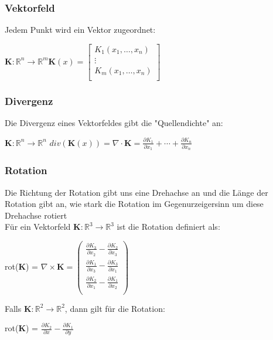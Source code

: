\documentclass[a4paper, fontsize = 8pt, landscape]{scrartcl}
\newcommand{\R}[0]{\mathbb{R}}
\begin{document}
\begin{multicols*}{3}
    \subsubsection*{Vektorfeld}
    Jedem Punkt wird ein Vektor zugeordnet:
    \begin{center}
        $\mathbf{K}: \R^n \rightarrow \R^m \mathbf{K}(x) =  \begin{bmatrix}
                K_1(x_1, \dots, x_n) \\
                \vdots               \\
                K_m(x_1, \dots, x_n) \\
            \end{bmatrix}$
    \end{center}
    \subsubsection*{Divergenz}
    Die Divergenz eines Vektorfeldes gibt die "Quellendichte" an:
    \begin{center}
        $\mathbf{K}:\R^n \rightarrow \R^n$ $div(\mathbf{K}(x))= \nabla \cdot \mathbf{K}=\frac{\partial K_1}{\partial x_1}+ \cdots + \frac{\partial K_n}{\partial x_n}$
    \end{center}
    \subsubsection*{Rotation}
    Die Richtung der Rotation gibt uns eine Drehachse an und die Länge der Rotation gibt an, wie stark die Rotation im Gegenurzeigersinn um diese Drehachse rotiert \\
    Für ein Vektorfeld $\mathbf{K}:\R^3 \rightarrow \R^3$ ist die Rotation definiert als:
    \begin{center}
        rot($\mathbf{K}$) = $\nabla \times \mathbf{K}=\begin{pmatrix}
                \frac{\partial K_3}{\partial x_2}-\frac{\partial K_2}{\partial x_3} \\
                \frac{\partial K_1}{\partial x_3}-\frac{\partial K_3}{\partial x_1} \\
                \frac{\partial K_2}{\partial x_1}-\frac{\partial K_1}{\partial x_2} \\
            \end{pmatrix}$
    \end{center}
    Falls $\mathbf{K}: \R^2 \rightarrow \R^2$, dann gilt für die Rotation:
    \begin{center}
        rot($\mathbf{K}$) = $\frac{\partial K_2}{\partial x}-\frac{\partial K_1}{\partial y}$
    \end{center}


\end{multicols*}
\end{document}
